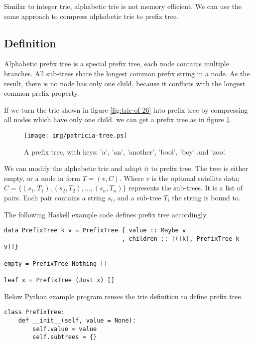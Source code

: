 \documentclass[b5paper]{article}
\begin{document}
Similar to integer trie, alphabetic trie is not memory
efficient. We can use the same approach to compress alphabetic trie to
prefix tree.

\subsection{Definition}

Alphabetic prefix tree is a special prefix tree, each node contains
multiple branches. All sub-trees share the longest common
prefix string in a node. As the result, there is no node has only one child,
because it conflicts with the longest common prefix property.

If we turn the trie shown in figure \ref{fig:trie-of-26} into prefix tree
by compressing all nodes which have only one child. we can get
a prefix tree as in figure \ref{fig:patricia-tree}.

\begin{figure}[htbp]
  \centering
  \texttt{[image: img/patricia-tree.ps]}
  \caption{A prefix tree, with keys: 'a', 'an', 'another', 'bool',
    'boy' and 'zoo'.}
  \label{fig:patricia-tree}
\end{figure}

We can modify the alphabetic trie and adapt it
to prefix tree. The tree is either empty, or a node in form $T = (v, C)$.
Where $v$ is the optional satellite data; $C = \{(s_1, T_1), (s_2, T_2), ..., (s_n, T_n)\}$ represents the sub-trees. It is a list of pairs. Each pair contains
a string $s_i$, and a sub-tree $T_i$ the string is bound to.

The following Haskell example code defines prefix tree accordingly.

\lstset{language=Haskell}
\begin{lstlisting}
data PrefixTree k v = PrefixTree { value :: Maybe v
                                 , children :: [([k], PrefixTree k v)]}

empty = PrefixTree Nothing []

leaf x = PrefixTree (Just x) []
\end{lstlisting}

Below Python example program reuses the trie definition to define prefix tree.

\lstset{language=Python}
\begin{lstlisting}
class PrefixTree:
    def __init__(self, value = None):
        self.value = value
        self.subtrees = {}
\end{lstlisting}
\end{document}
